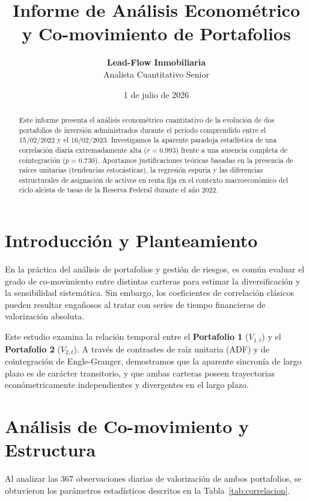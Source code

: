 \documentclass[11pt,a4paper]{article}
\title{\textbf{Informe de Análisis Econométrico y Co-movimiento de Portafolios}}
\author{\textbf{Lead-Flow Inmobiliaria} \\ Analista Cuantitativo Senior}
\date{1 de julio de 2026}
\begin{document}
\maketitle

\begin{abstract}
Este informe presenta el análisis econométrico cuantitativo de la evolución de dos portafolios de inversión administrados durante el período comprendido entre el 15/02/2022 y el 16/02/2023. Investigamos la aparente paradoja estadística de una correlación diaria extremadamente alta ($r = 0.993$) frente a una ausencia completa de cointegración ($p = 0.730$). Aportamos justificaciones teóricas basadas en la presencia de raíces unitarias (tendencias estocásticas), la regresión espuria y las diferencias estructurales de asignación de activos en renta fija en el contexto macroeconómico del ciclo alcista de tasas de la Reserva Federal durante el año 2022.
\end{abstract}

\newpage

\section{Introducción y Planteamiento}
En la práctica del análisis de portafolios y gestión de riesgos, es común evaluar el grado de co-movimiento entre distintas carteras para estimar la diversificación y la sensibilidad sistemática. Sin embargo, los coeficientes de correlación clásicos pueden resultar engañosos al tratar con series de tiempo financieras de valorización absoluta. 

Este estudio examina la relación temporal entre el \textbf{Portafolio 1} ($V_{1,t}$) y el \textbf{Portafolio 2} ($V_{2,t}$). A través de contrastes de raíz unitaria (ADF) y de cointegración de Engle-Granger, demostramos que la aparente sincronía de largo plazo es de carácter transitorio, y que ambas carteras poseen trayectorias económetricamente independientes y divergentes en el largo plazo.

\section{Análisis de Co-movimiento y Estructura}
Al analizar las $367$ observaciones diarias de valorización de ambos portafolios, se obtuvieron los parámetros estadísticos descritos en la Tabla~\ref{tab:correlacion}.
\end{document}
